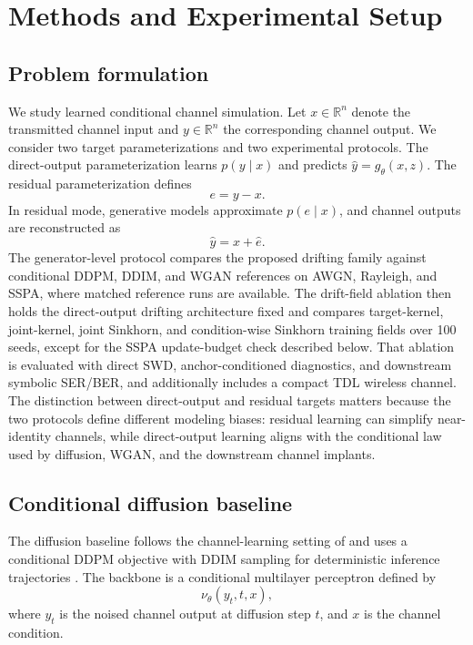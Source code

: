 \section{Methods and Experimental Setup}
\label{sec:methods}

\subsection{Problem formulation}
We study learned conditional channel simulation.
Let \(x \in \mathbb{R}^n\) denote the transmitted channel input and \(y \in \mathbb{R}^n\) the corresponding channel output.
We consider two target parameterizations and two experimental protocols.
The direct-output parameterization learns \(p(y\mid x)\) and predicts \(\hat y=g_\theta(x,z)\).
The residual parameterization defines
\begin{equation}
e = y - x.
\end{equation}
In residual mode, generative models approximate \(p(e \mid x)\), and channel outputs are reconstructed as
\begin{equation}
\hat{y} = x + \hat{e}.
\end{equation}
The generator-level protocol compares the proposed drifting family against conditional DDPM, DDIM, and WGAN references on AWGN, Rayleigh, and SSPA, where matched reference runs are available.
The drift-field ablation then holds the direct-output drifting architecture fixed and compares target-kernel, joint-kernel, joint Sinkhorn, and condition-wise Sinkhorn training fields over 100 seeds, except for the SSPA update-budget check described below.
That ablation is evaluated with direct SWD, anchor-conditioned diagnostics, and downstream symbolic SER/BER, and additionally includes a compact TDL wireless channel.
The distinction between direct-output and residual targets matters because the two protocols define different modeling biases: residual learning can simplify near-identity channels, while direct-output learning aligns with the conditional law used by diffusion, WGAN, and the downstream channel implants.

\subsection{Conditional diffusion baseline}
The diffusion baseline follows the channel-learning setting of \cite{paper2309} and uses a conditional DDPM objective \cite{ddpm} with DDIM sampling for deterministic inference trajectories \cite{ddim}.
The backbone is a conditional multilayer perceptron defined by
\begin{equation}
\nu_\theta(y_t, t, x),
\end{equation}
where \(y_t\) is the noised channel output at diffusion step \(t\), and \(x\) is the channel condition.

